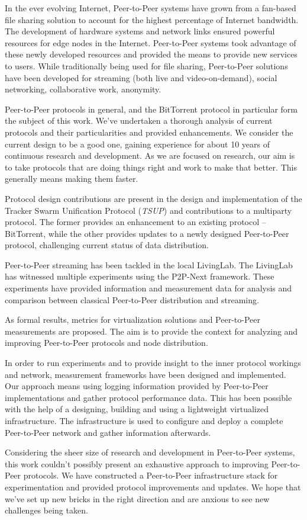 
In the ever evolving Internet, Peer-to-Peer systems have grown from a
fan-based file sharing solution to account for the highest percentage of
Internet bandwidth. The development of hardware systems and network links
ensured powerful resources for edge nodes in the Internet. Peer-to-Peer
systems took advantage of these newly developed resources and provided the
means to provide new services to users. While traditionally being used for
file sharing, Peer-to-Peer solutions have been developed for streaming (both
live and video-on-demand), social networking, collaborative work, anonymity.

Peer-to-Peer protocols in general, and the BitTorrent protocol in particular
form the subject of this work. We've undertaken a thorough analysis of current
protocols and their particularities and provided enhancements. We consider the
current design to be a good one, gaining experience for about 10 years of
continuous research and development. As we are focused on research, our aim is
to take protocols that are doing things right and work to make that better.
This generally means making them faster.

Protocol design contributions are present in the design and implementation of
the Tracker Swarm Unification Protocol (\textit{TSUP}) and contributions to a
multiparty protocol. The former provides an enhancement to an existing
protocol -- BitTorrent, while the other provides updates to a newly designed
Peer-to-Peer protocol, challenging current status of data distribution.

Peer-to-Peer streaming has been tackled in the local LivingLab. The LivingLab
has witnessed multiple experiments using the P2P-Next framework. These
experiments have provided information and measurement data for analysis and
comparison between classical Peer-to-Peer distribution and streaming.

As formal results, metrics for virtualization solutions and Peer-to-Peer
measurements are proposed. The aim is to provide the context for analyzing and
improving Peer-to-Peer protocols and node distribution.

In order to run experiments and to provide insight to the inner protocol
workings and network, measurement frameworks have been designed and
implemented. Our approach means using logging information provided by
Peer-to-Peer implementations and gather protocol performance data. This has
been possible with the help of a designing, building and using a lightweight
virtualized infrastructure. The infrastructure is used to configure and deploy
a complete Peer-to-Peer network and gather information afterwards.

Considering the sheer size of research and development in Peer-to-Peer
systems, this work couldn't possibly present an exhaustive approach to
improving Peer-to-Peer protocols. We have constructed a Peer-to-Peer
infrastructure stack for experimentation and provided protocol improvements
and updates. We hope that we've set up new bricks in the right direction and
are anxious to see new challenges being taken.
